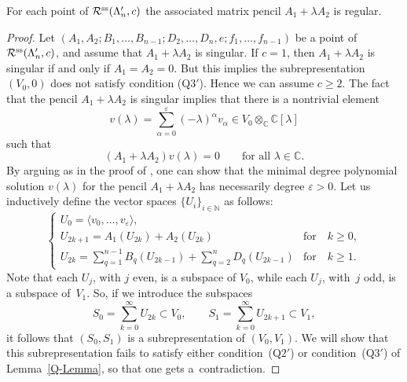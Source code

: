 \begin{Proposition}\label{prop-regular-in-R'}
For each point of $\mathcal{R}^{\rm ss}(\Lambda'_{n}, c)$ the associated matrix pencil $A_{1}+\lambda A_{2}$ is regular.
\end{Proposition}
\begin{proof}
Let $(A_1,A_2;B_1,\dots,B_{n-1};D_{2},\dots,D_{n},e;f_1,\dots,f_{n-1})$ be a point of $\mathcal{R}^{\rm ss}(\Lambda'_{n}, c)$,
and assume that $A_{1}+\lambda A_{2}$ is singular.
If $c=1$, then $A_{1}+\lambda A_{2}$ is singular if and only if $A_{1}=A_{2}=0$. But this implies the subrepresentation
$(V_0,0)$ does not satisfy condition (Q$3'$). Hence we can assume $c\geq 2$.
The fact that the pencil $A_{1}+\lambda A_{2}$ is singular implies that
there is a nontrivial element
\begin{equation}
v(\lambda)=\sum_{\alpha=0}^{\varepsilon}(-\lambda)^{\alpha}v_{\alpha} \in V_0\otimes_{\mathbb{C}}\mathbb{C}[\lambda]
\label{eq-v(l)}
\end{equation}
such that
\begin{equation}
(A_{1}+\lambda A_{2})v(\lambda)=0\qquad\text{for all $\lambda\in\mathbb{C}$.}
\label{eq-Av(l)}
\end{equation}
By arguing as in the proof of \cite[Lemma~4.11]{bblr}, one can show that the minimal degree
polynomial solution $v(\lambda)$ for the pencil $A_{1}+\lambda A_{2}$ has necessarily degree $\varepsilon >0$.
Let us inductively define the vector spaces $\{U_{i}\}_{i\in \mathbb{N}}$ as follows:
\begin{equation*}
 \begin{cases}
 U_{0}=\langle v_{0},\dots,v_{\varepsilon}\rangle, & \\
 U_{2k+1}=A_{1}(U_{2k})+A_{2}(U_{2k}) &\text{for}\quad k\geq0,\\
 \displaystyle U_{2k}=\sum\limits_{q=1}^{n-1}B_{q}(U_{2k-1})+\sum\limits_{q=2}^{n}D_{q}(U_{2k-1}) &\text{for}\quad k\geq1 .
\end{cases}
\end{equation*}
Note that each $U_{j}$, with $j$ even, is a subspace of $V_0$, while each $U_{j}$, with~$j$ odd, is a subspace of~$V_1$. So, if we introduce the subspaces
\begin{equation*}
S_{0}=\sum_{k=0}^{\infty}U_{2k} \subset V_0 ,\qquad S_{1}=\sum_{k=0}^{\infty}U_{2k+1}\subset V_1 ,
\end{equation*}
it follows that $(S_{0},S_{1})$ is a subrepresentation of $(V_0, V_1)$. We will show that this subrepresentation fails to satisfy either condition~(Q$2'$) or condition~(Q$3'$) of Lemma~\ref{Q-Lemma}, so that one gets a~contradiction.


\end{proof}
